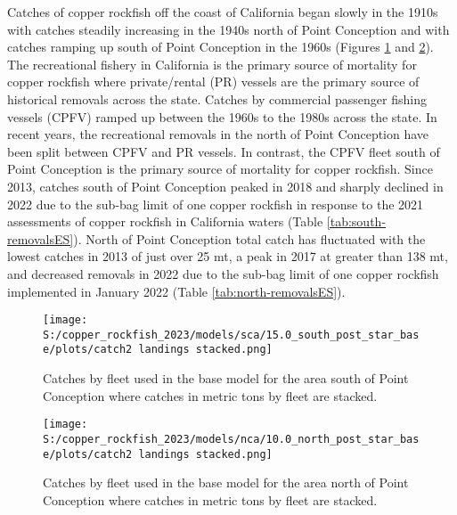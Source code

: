 \documentclass[11pt,
  letterpaper,
]{article}
\begin{document}
Catches of copper rockfish off the coast of California began slowly in the 1910s with catches steadily increasing in the 1940s north of Point Conception and with catches ramping up south of Point Conception in the 1960s (Figures \ref{fig:es-south-catch} and \ref{fig:es-north-catch}). The recreational fishery in California is the primary source of mortality for copper rockfish where private/rental (PR) vessels are the primary source of historical removals across the state. Catches by commercial passenger fishing vessels (CPFV) ramped up between the 1960s to the 1980s across the state. In recent years, the recreational removals in the north of Point Conception have been split between CPFV and PR vessels. In contrast, the CPFV fleet south of Point Conception is the primary source of mortality for copper rockfish. Since 2013, catches south of Point Conception peaked in 2018 and sharply declined in 2022 due to the sub-bag limit of one copper rockfish in response to the 2021 assessments of copper rockfish in California waters (Table \ref{tab:south-removalsES}). North of Point Conception total catch has fluctuated with the lowest catches in 2013 of just over 25 mt, a peak in 2017 at greater than 138 mt, and decreased removals in 2022 due to the sub-bag limit of one copper rockfish implemented in January 2022 (Table \ref{tab:north-removalsES}).





\begin{figure}
{\centering
\texttt{[image: S:/copper\_rockfish\_2023/models/sca/15.0\_south\_post\_star\_base/plots/catch2 landings stacked.png]}
}
\caption{Catches by fleet used in the base model for the area south of Point Conception where catches in metric tons by fleet are stacked.\label{fig:es-south-catch}}
\end{figure}

\begin{figure}
{\centering
\texttt{[image: S:/copper\_rockfish\_2023/models/nca/10.0\_north\_post\_star\_base/plots/catch2 landings stacked.png]}
}
\caption{Catches by fleet used in the base model for the area north of Point Conception where catches in metric tons by fleet are stacked.\label{fig:es-north-catch}}
\end{figure}
\end{document}
